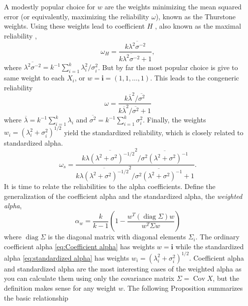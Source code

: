 \documentclass{article}
\theoremstyle{plain}
\theoremstyle{plain}
\theoremstyle{definition}
\theoremstyle{remark}
\theoremstyle{definition}
\theoremstyle{plain}
\theoremstyle{plain}
\theoremstyle{definition}
\DeclareMathOperator{\Cov}{Cov}
\DeclareMathOperator{\diag}{diag}
\renewcommand{\sqrt}[1]{{(#1)^{1/2}}}
\begin{document}
A modestly popular choice for $w$ are the weights minimizing the mean squared error (or equivalently, maximizing the reliability $\omega$), known as the Thurstone \citep{thurshronebook} weights. Using these weights lead to coefficient $H$ \citep{hancock2001rethinking}, also known as the maximal reliability \citep{Li1997-yh}, 
\begin{equation}
\label{eq:coefficient_H}
\omega_{H}=\frac{k\overline{\lambda^{2}\sigma^{-2}}}{k\overline{\lambda^{2}\sigma^{-2}}+1},
\end{equation}
where $\overline{\lambda^{2}\sigma^{-2}} = k^{-1}\sum_{i=1}^{k}\lambda_{i}^2/\sigma_i^2$. But by far the most popular choice is give to same weight to each $X_i$, or $w = \mathbf{i}=\left(1,1,\ldots,1\right)$. This leads to the congeneric reliability
\begin{equation}
\omega =\frac{k\overline{\lambda}^{2}/\overline{\sigma^{2}}}{k\overline{\lambda}^{2}/\overline{\sigma^{2}} + 1}\label{eq:Congeneric reliability}
\end{equation}
where $\overline{\lambda}=k^{-1}\sum_{i=1}^{k}\lambda_{i}$ and
$\overline{\sigma^{2}}=k^{-1}\sum_{i=1}^{k}\sigma_{i}^{2}$. Finally, the weights $w_i = \sqrt{\lambda_i^2 + \sigma_i^2}$ yield the standardized reliability, which is closely related to standardized alpha.
\begin{equation}
\omega_s=\frac{k\overline{\lambda(\lambda^{2}+\sigma^{2})^{-1/2}}^{2}/\overline{\sigma^{2}(\lambda^{2}+\sigma^{2})^{-1}}}{k\overline{\lambda(\lambda^{2}+\sigma^{2})^{-1/2}}^{2}/\overline{\sigma^{2}(\lambda^{2}+\sigma^{2})^{-1}}+1}.\label{eq:Standardized reliability}
\end{equation}
It is time to relate the reliabilities to the alpha coefficients.
Define the generalization of the coefficient alpha and the standardized
alpha, the \emph{weighted alpha},
\begin{equation}
\alpha_{w}=\frac{k}{k-1}\left(1-\frac{w^{T}(\diag\Sigma)w}{w^{T}\Sigma w}\right)\label{eq:weighted alpha}
\end{equation}
where $\diag\Sigma$ is the diagonal matrix with diagonal elements $\Sigma_i$.
The ordinary coefficient alpha \eqref{eq:Coefficient alpha} has weights $w=\mathbf{i}$
while the standardized alpha \eqref{eq:standardized alpha} has weights $w_{i}=\sqrt{\lambda_{i}^{2}+\sigma_{i}^{2}}$. Coefficient alpha and standardized alpha are the most interesting cases of the weighted alpha as you can calculate them using only the covariance matrix $\Sigma = \Cov X$, but the definition makes sense for any weight $w$. The following Proposition summarizes the basic relationship
\end{document}
